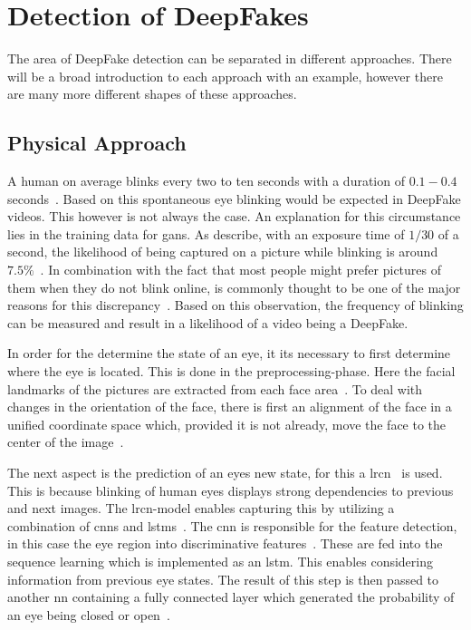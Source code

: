 \section{Detection of DeepFakes}
The area of DeepFake detection can be separated in different approaches.
There will be a broad introduction to each approach with an example, however there
are many more different shapes of these approaches.

\subsection{Physical Approach}
A human on average blinks every two to ten seconds with a duration of \(0.1-0.4\)
seconds~\cite{li_ictu_2018}. Based on this spontaneous eye blinking would be
expected in DeepFake videos. This however is not always the case. An explanation
for this circumstance lies in the training data for \glspl{gan}. As 
\textcite{li_ictu_2018} describe, with an exposure time of \(1/30\) of a second,
the likelihood of being captured on a picture while blinking is around \(7.5\%\)~\cite{li_ictu_2018}.
In combination with the fact that most people might prefer pictures of them when
they do not blink online, is commonly thought to be one of the major reasons for
this discrepancy~\cite{pishori_detecting_2020}. Based on this observation, the
frequency of blinking can be measured and result in a likelihood of a video being
a DeepFake.

\par
In order for the determine the state of an eye, it its necessary to first determine
where the eye is located. This is done in the preprocessing-phase. Here the facial
landmarks of the pictures are extracted from each face area~\cite{li_ictu_2018}.
To deal with changes in the orientation of the face, there is first an alignment
of the face in a unified coordinate space which, provided it is not already,
move the face to the center of the image~\cite{li_ictu_2018}.

\par
The next aspect is the prediction of an eyes new state, for this a \gls{lrcn}~\cite{donahue_long-term_2014}
is used. This is because blinking of human eyes displays strong dependencies to
previous and next images. The \gls{lrcn}-model enables capturing this by utilizing
a combination of \glspl{cnn} and \glspl{lstm}~\cite{donahue_long-term_2014}.
The \gls{cnn} is responsible for the feature detection, in this case the eye
region into discriminative features~\cite{li_ictu_2018,donahue_long-term_2014}. 
These are fed into the sequence learning which is implemented as an \gls{lstm}.
This enables considering information from previous eye states. The result of
this step is then passed to another \gls{nn} containing a fully connected layer
which generated the probability of an eye being closed or open~\cite{li_ictu_2018}.

